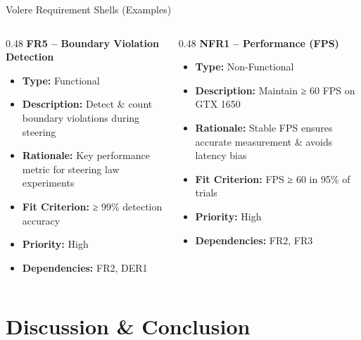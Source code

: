 \documentclass[aspectratio=169, 10pt]{beamer}
\begin{document}
\begin{frame}{Volere Requirement Shells (Examples)}
  \begin{columns}[T]
    \begin{column}{0.48\textwidth}
      \textbf{FR5 -- Boundary Violation Detection}
      \begin{itemize}
        \item \textbf{Type:} Functional
        \item \textbf{Description:} Detect \& count boundary violations during steering
        \item \textbf{Rationale:} Key performance metric for steering law experiments
        \item \textbf{Fit Criterion:} ≥ 99\% detection accuracy
        \item \textbf{Priority:} High
        \item \textbf{Dependencies:} FR2, DER1
      \end{itemize}
    \end{column}
    \begin{column}{0.48\textwidth}
      \textbf{NFR1 -- Performance (FPS)}
      \begin{itemize}
        \item \textbf{Type:} Non-Functional
        \item \textbf{Description:} Maintain ≥ 60 FPS on GTX 1650
        \item \textbf{Rationale:} Stable FPS ensures accurate measurement \& avoids latency bias
        \item \textbf{Fit Criterion:} FPS ≥ 60 in 95\% of trials
        \item \textbf{Priority:} High
        \item \textbf{Dependencies:} FR2, FR3
      \end{itemize}
    \end{column}
  \end{columns}
\end{frame}

\section{Discussion \& Conclusion}
\end{document}
